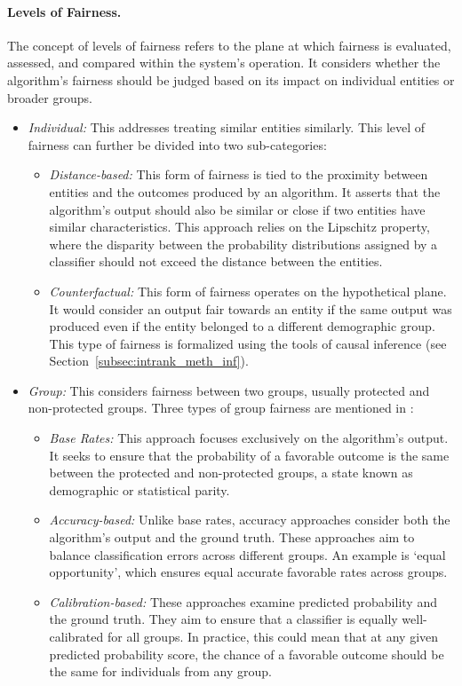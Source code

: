 \paragraph{Levels of Fairness.}
\label{subsubsec:fairness_tax_lev}
The concept of levels of fairness refers to the plane at which fairness is evaluated, assessed, and compared within the system's operation. It considers whether the algorithm's fairness should be judged based on its impact on individual entities or broader groups.

\begin{itemize}
  \item \emph{Individual:} This addresses treating similar entities similarly. This level of fairness can further be divided into two sub-categories:
  \begin{itemize}
  \item \emph{Distance-based:} This form of fairness is tied to the proximity between entities and the outcomes produced by an algorithm. It asserts that the algorithm's output should also be similar or close if two entities have similar characteristics. This approach relies on the Lipschitz property, where the disparity between the probability distributions assigned by a classifier should not exceed the distance between the entities.
  \item \emph{Counterfactual:} This form of fairness operates on the hypothetical plane. It would consider an output fair towards an entity if the same output was produced even if the entity belonged to a different demographic group. This type of fairness is formalized using the tools of causal inference (see Section~\ref{subsec:intrank_meth_inf}).
\end{itemize}

  \item \emph{Group:} This considers fairness between two groups, usually protected and non-protected groups. Three types of group fairness are mentioned in \cite{pitoura2022fairness}:
  \begin{itemize}
  \item \emph{Base Rates:} This approach focuses exclusively on the algorithm's output. It seeks to ensure that the probability of a favorable outcome is the same between the protected and non-protected groups, a state known as demographic or statistical parity.
  \item \emph{Accuracy-based:} Unlike base rates, accuracy approaches consider both the algorithm's output and the ground truth. These approaches aim to balance classification errors across different groups. An example is `equal opportunity', which ensures equal accurate favorable rates across groups.
  \item \emph{Calibration-based:} These approaches examine predicted probability and the ground truth. They aim to ensure that a classifier is equally well-calibrated for all groups. In practice, this could mean that at any given predicted probability score, the chance of a favorable outcome should be the same for individuals from any group.
\end{itemize}
\end{itemize}

